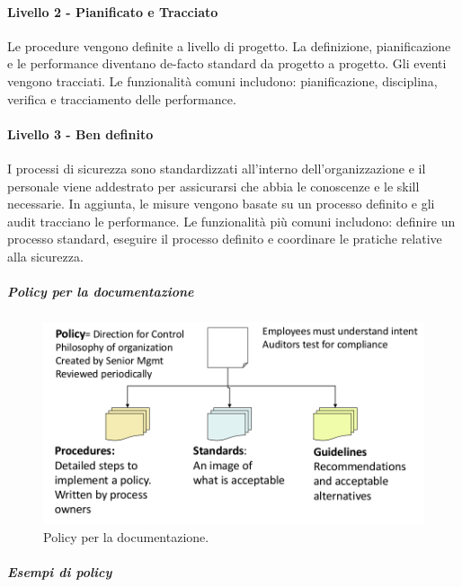 \paragraph{Livello 2 - Pianificato e Tracciato}

Le procedure vengono definite a livello di progetto. La definizione, pianificazione
e le performance diventano de-facto standard da progetto a progetto. Gli eventi
vengono tracciati. Le funzionalità comuni includono: pianificazione, disciplina,
verifica e tracciamento delle performance.

\paragraph{Livello 3 - Ben definito}

I processi di sicurezza sono standardizzati all'interno dell'organizzazione e il
personale viene addestrato per assicurarsi che abbia le conoscenze e le skill
necessarie. In aggiunta, le misure vengono basate su un processo definito e gli
audit tracciano le performance. Le funzionalità più comuni includono: definire
un processo standard, eseguire il processo definito e coordinare le pratiche
relative alla sicurezza.

\subparagraph*{Policy per la documentazione}

\begin{figure}[h!]
        \begin{center}
                \includegraphics[scale=0.4]{res/img/documentation_policy}
        \end{center}
        \caption{Policy per la documentazione.}
\end{figure}

\subparagraph{Esempi di policy}

